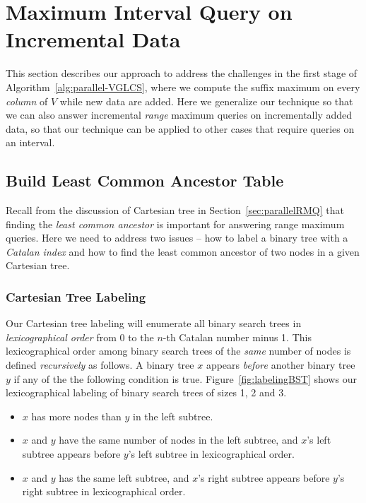 \section{Maximum Interval Query on Incremental Data} \label{sec:QIUD}

This section describes our approach to address the challenges in the
first stage of Algorithm~\ref{alg:parallel-VGLCS}, where we compute
the suffix maximum on every {\em column} of $V$ while new data are
added.  Here we generalize our technique so that we can also answer
incremental {\em range} maximum queries on incrementally added data,
so that our technique can be applied to other cases that require
queries on an interval.

%

\subsection{Build Least Common Ancestor Table}

Recall from the discussion of Cartesian tree in
Section~\ref{sec:parallelRMQ} that finding the {\em least common
  ancestor} is important for answering range maximum queries.  Here we
need to address two issues -- how to label a binary tree with a {\em
  Catalan index} and how to find the least common ancestor of two
nodes in a given Cartesian tree.

\subsubsection{Cartesian Tree Labeling}

Our Cartesian tree labeling will enumerate all binary search trees in
{\em lexicographical order} from $0$ to the $n$-th Catalan number
minus 1.  This lexicographical order among binary search trees of the
{\em same} number of nodes is defined {\em recursively} as follows.  A
binary tree $x$ appears {\em before} another binary tree $y$ if any of
the the following condition is true.  Figure~\ref{fig:labelingBST}
shows our lexicographical labeling of binary search trees of sizes 1,
2 and 3.

\begin{itemize}
\item $x$ has more nodes than $y$ in the left subtree.
\item $x$ and $y$ have the same number of nodes in the left subtree,
  and $x$'s left subtree appears before $y$'s left subtree in
  lexicographical order.
\item $x$ and $y$ has the same left subtree, and $x$'s right subtree
  appears before $y$'s right subtree in lexicographical order.
\end{itemize}

